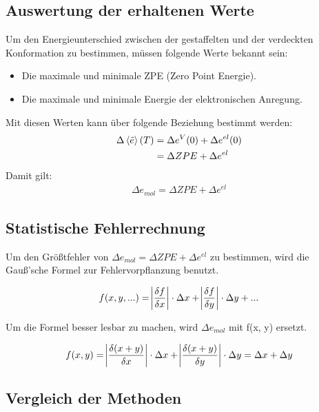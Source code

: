 \subsection{Auswertung der erhaltenen Werte}
Um den Energieunterschied zwischen der gestaffelten und der verdeckten Konformation zu bestimmen, müssen folgende Werte bekannt sein:
\begin{itemize}
    \item Die maximale und minimale ZPE (Zero Point Energie).
    \item Die maximale und minimale Energie der elektronischen Anregung.
\end{itemize}
Mit diesen Werten kann über folgende Beziehung bestimmt werden:
\begin{align*}
    \Delta \braket{\tilde{e}}(T) &= \Delta e^V (0) + \Delta e^{el} (0) \\
                                 &= \Delta ZPE + \Delta e^{el}   
\end{align*} 
Damit gilt:
\begin{align}
    \Delta e_{mol} = \Delta ZPE + \Delta e^{el} 
\end{align}


\subsection{Statistische Fehlerrechnung}

Um den Größtfehler von $\Delta e_{mol} = \Delta ZPE + \Delta e^{el} $ zu bestimmen, wird die Gauß'sche Formel zur Fehlervorpflanzung benutzt.

\begin{align}
    f(x, y, ...) = \abs{\frac{\delta f}{\delta x}} \cdot \Delta x + \abs{\frac{\delta f}{\delta y}} \cdot \Delta y + ...
\end{align}

Um die Formel besser lesbar zu machen, wird $\Delta e_{mol}$ mit f(x, y) ersetzt.

\begin{align*}
    f(x, y) =  \abs{\frac{\delta (x + y)}{\delta x}} \cdot \Delta x + \abs{\frac{\delta (x + y)}{\delta y}} \cdot \Delta y = \Delta x + \Delta y
\end{align*}

\subsection{Vergleich der Methoden}

